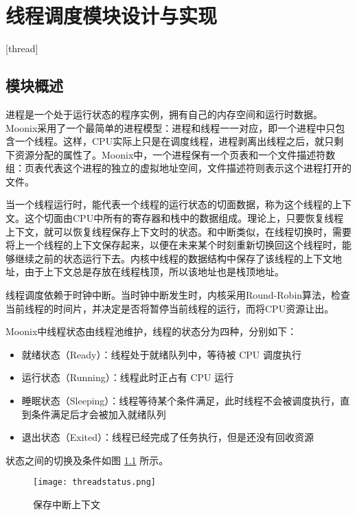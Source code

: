 
\chapter{线程调度模块设计与实现}[thread]
\label{chapter:thread}

\section{模块概述}

进程是一个处于运行状态的程序实例，拥有自己的内存空间和运行时数据。Moonix采用了一个最简单的进程模型：进程和线程一一对应，即一个进程中只包含一个线程。这样，CPU实际上只是在调度线程，进程剥离出线程之后，就只剩下资源分配的属性了。Moonix中，一个进程保有一个页表和一个文件描述符数组：页表代表这个进程的独立的虚拟地址空间，文件描述符则表示这个进程打开的文件。

当一个线程运行时，能代表一个线程的运行状态的切面数据，称为这个线程的上下文。这个切面由CPU中所有的寄存器和栈中的数据组成。理论上，只要恢复线程上下文，就可以恢复线程保存上下文时的状态。和中断类似，在线程切换时，需要将上一个线程的上下文保存起来，以便在未来某个时刻重新切换回这个线程时，能够继续之前的状态运行下去。内核中线程的数据结构中保存了该线程的上下文地址，由于上下文总是存放在线程栈顶，所以该地址也是栈顶地址。

线程调度依赖于时钟中断。当时钟中断发生时，内核采用Round-Robin算法\cite{DBLP:journals/eor/RasmussenT08}，检查当前线程的时间片，并决定是否将暂停当前线程的运行，而将CPU资源让出。

Moonix中线程状态由线程池维护，线程的状态分为四种，分别如下：

\begin{itemize}
	\item 就绪状态（Ready）：线程处于就绪队列中，等待被 CPU 调度执行
	\item 运行状态（Running）：线程此时正占有 CPU 运行
	\item 睡眠状态（Sleeping）：线程等待某个条件满足，此时线程不会被调度执行，直到条件满足后才会被加入就绪队列
	\item 退出状态（Exited）：线程已经完成了任务执行，但是还没有回收资源
\end{itemize}

状态之间的切换及条件如图 \ref{pic:threadstatus} 所示。

\begin{figure}[htpb]
	\centering
	\texttt{[image: threadstatus.png]}
	\setlength{\abovecaptionskip}{2pt}
	\caption{保存中断上下文}
	\label{pic:threadstatus}
\end{figure}

